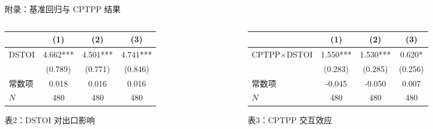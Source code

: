 \documentclass[aspectratio=169,10pt]{ctexbeamer}
\begin{document}
\begin{frame}{附录：基准回归与 CPTPP 结果}
  \begin{columns}[T,totalwidth=\textwidth]
    \begin{column}{0.48\textwidth}
      \begin{table}
      \centering
      \scriptsize
      \begin{tabular}{lccc}
        \toprule
        & (1) & (2) & (3) \\
        \midrule
        DSTOI & 4.662*** & 4.501*** & 4.741*** \\
        & (0.789) & (0.771) & (0.846) \\
        常数项 & 0.018 & 0.016 & 0.016 \\
        $N$ & 480 & 480 & 480 \\
        \bottomrule
      \end{tabular}
      {\scriptsize 表2：DSTOI 对出口影响}
      \end{table}
    \end{column}
    \begin{column}{0.48\textwidth}
      \begin{table}
      \centering
      \scriptsize
      \begin{tabular}{lccc}
        \toprule
        & (1) & (2) & (3) \\
        \midrule
        CPTPP$\times$DSTOI & 1.550*** & 1.530*** & 0.620* \\
        & (0.283) & (0.285) & (0.256) \\
        常数项 & -0.045 & -0.050 & 0.007 \\
        $N$ & 480 & 480 & 480 \\
        \bottomrule
      \end{tabular}
      {\scriptsize 表3：CPTPP 交互效应}
      \end{table}
    \end{column}
  \end{columns}
\end{frame}
\end{document}
